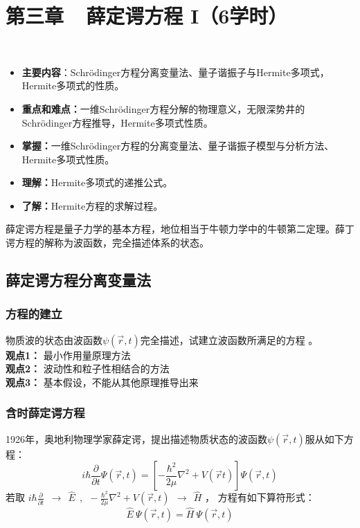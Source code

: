 \renewcommand{\thechapter}{}
\chapter{第三章~~薛定谔方程 I（6学时）} 
\renewcommand{\thechapter}{3}
 ~~~\hspace*{\fill} \\
\begin{itemize}
\item \textbf{主要内容}：Schrödinger方程分离变量法、量子谐振子与Hermite多项式，Hermite多项式的性质。
\item \textbf{重点和难点：}一维Schrödinger方程分解的物理意义，无限深势井的Schrödinger方程推导，Hermite多项式性质。
\item \textbf{掌握：}一维Schrödinger方程的分离变量法、量子谐振子模型与分析方法、Hermite多项式性质。
\item \textbf{理解：}Hermite多项式的递推公式。
\item \textbf{了解：}Hermite方程的求解过程。
\end{itemize}

薛定谔方程是量子力学的基本方程，地位相当于牛顿力学中的牛顿第二定理。薛丁谔方程的解称为波函数，完全描述体系的状态。

\section{薛定谔方程分离变量法}
\subsection{方程的建立}
\begin{example} %
物质波的状态由波函数$\psi(\overrightarrow{r},t)$完全描述，试建立波函数所满足的方程 。\\
\textbf{ 观点1：}  最小作用量原理方法  \\ 
\textbf{ 观点2：}  波动性和粒子性相结合的方法  \\ 
\textbf{ 观点3：}  基本假设，不能从其他原理推导出来 \\
\end{example}

\subsection{含时薛定谔方程}
1926年，奥地利物理学家薛定谔，提出描述物质状态的波函数$\psi(\overrightarrow{r},t)$服从如下方程：\\
 \begin{equation*}
  i\hbar \frac{\partial }{\partial t} \Psi (\overrightarrow{r},t ) =\left [ -\frac{\hbar^2}{2\mu }\nabla ^2 + V(\overrightarrow{r}t ) \right ]\Psi (\overrightarrow{r}, t ) 
 \end{equation*}
若取 $ \displaystyle  i\hbar \frac{\partial }{\partial t} ~~\to ~~ \hat{E} ~~, ~~  -\frac{\hbar^2}{2\mu }\nabla ^2 + V(\vec{r},t ) ~~\to ~~ \hat{H} $ ，
方程有如下算符形式：   \\ 
 \begin{equation*}
  \hat{E} ~ \Psi (\overrightarrow{r},t )  = \hat{H} ~ \Psi (\overrightarrow{r},t )  
\end{equation*}

